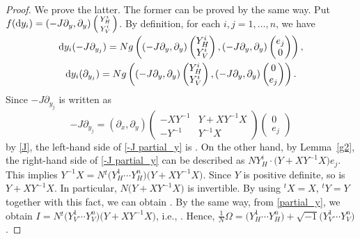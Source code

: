 \documentclass[10pt,a4paper]{amsart}
\numberwithin{equation}{section}
\begin{document}
\begin{proof}
We prove the latter. The former can be proved by the same way.
Put $f({\rm d}y_i)=\smash{(-J\partial_y, \partial_y)
\left(\begin{smallmatrix}
Y^i_H \\
Y^i_V
\end{smallmatrix}\right)}$. By definition, for each $i, j=1,\ldots ,n$, we have
\begin{gather}
{\rm d}y_i(-J\partial_{y_j})=Ng\left((-J\partial_y, \partial_y)
\begin{pmatrix}
Y^i_H \\
Y^i_V
\end{pmatrix},
(-J\partial_y, \partial_y)
\begin{pmatrix}
e_j \\
0
\end{pmatrix}
\right), \label{-J partial_y}\\
{\rm d}y_i(\partial_{y_j})=Ng\left((-J\partial_y, \partial_y)
\begin{pmatrix}
Y^i_H \\
Y^i_V
\end{pmatrix},
(-J\partial_y, \partial_y)
\begin{pmatrix}
0 \\
e_j
\end{pmatrix}
\right). \label{partial_y}
\end{gather}
Since $-J\partial_{y_j}$ is written as
\[
-J\partial_{y_j}=(\partial_x, \partial_y)
\begin{pmatrix}
-XY^{-1} & Y+XY^{-1}X \\
-Y^{-1} & Y^{-1}X
\end{pmatrix}
\begin{pmatrix}
0 \\
e_j
\end{pmatrix}
\]
by \eqref{J}, the left-hand side of \eqref{-J partial_y} is . On the other hand, by Lemma~\ref{g2}, the right-hand side of \eqref{-J partial_y} can be described as $NY^i_H\cdot \bigl(Y+XY^{-1}X\bigr)e_j$. This implies $Y^{-1}X=N{}^t\bigl(Y^1_H\cdots Y^n_H\bigr)\bigl(Y+XY^{-1}X\bigr)$. Since $Y$ is positive definite, so is $Y+XY^{-1}X$. In particular, $N\bigl(Y+XY^{-1}X\bigr)$ is invertible. By using ${}^tX=X$, ${}^tY=Y$ together with this fact, we can obtain . By the same way, from \eqref{partial_y}, we obtain $I=N{}^t\bigl(Y^1_V\cdots Y^n_V\bigr)\bigl(Y+XY^{-1}X\bigr)$, i.e., . Hence, $\frac{1}{N}\Omega=\bigl(Y^1_H\cdots Y^n_H\bigr)+\sqrt{-1}\bigl(Y^1_V\cdots Y^n_V\bigr)$.
\end{proof}
\end{document}
